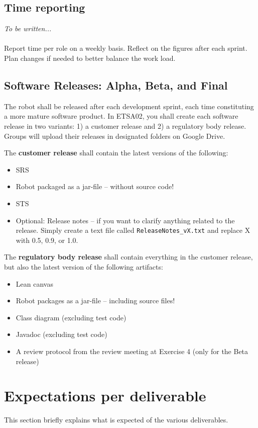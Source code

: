 \documentclass{scrreprt}
\begin{document}
\section{Time reporting} \label{sec:time}
\emph{To be written...}\\\\
Report time per role on a weekly basis. Reflect on the figures after each sprint. Plan changes if needed to better balance the work load.

\section{Software Releases: Alpha, Beta, and Final}
The robot shall be released after each development sprint, each time constituting a more mature software product. In ETSA02, you shall create each software release in two variants: 1) a customer release and 2) a regulatory body release. Groups will upload their releases in designated folders on Google Drive.

The \textbf{customer release} shall contain the latest versions of the following:

\begin{itemize}
\item SRS
\item Robot packaged as a jar-file -- without source code!
\item STS
\item Optional: Release notes -- if you want to clarify anything related to the release. Simply create a text file called \texttt{ReleaseNotes_vX.txt} and replace X with 0.5, 0.9, or 1.0.
\end{itemize}

The \textbf{regulatory body release} shall contain everything in the customer release, but also the latest version of the following artifacts:
\begin{itemize}
\item Lean canvas
\item Robot packages as a jar-file -- including source files!
\item Class diagram (excluding test code)
\item Javadoc (excluding test code)
\item A review protocol from the review meeting at Exercise 4 (only for the Beta release)
\end{itemize}

\chapter{Expectations per deliverable}
This section briefly explains what is expected of the various deliverables.
\end{document}
